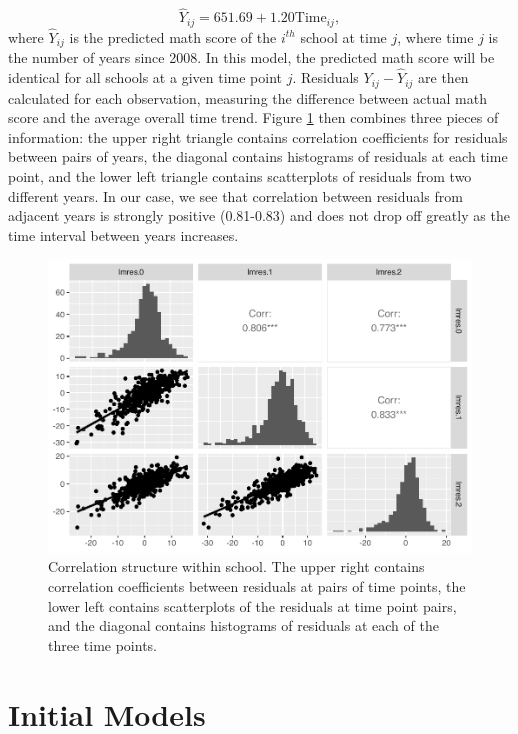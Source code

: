 \documentclass[
]{krantz}
\begin{document}
\begin{equation*}
\hat{Y}_{ij}=651.69+1.20\textrm{Time}_{ij},
\end{equation*}
where \(\hat{Y}_{ij}\) is the predicted math score of the \(i^{th}\) school at time \(j\), where time \(j\) is the number of years since 2008. In this model, the predicted math score will be identical for all schools at a given time point \(j\). Residuals \(Y_{ij}-\hat{Y}_{ij}\) are then calculated for each observation, measuring the difference between actual math score and the average overall time trend. Figure \ref{fig:lon-cor1} then combines three pieces of information: the upper right triangle contains correlation coefficients for residuals between pairs of years, the diagonal contains histograms of residuals at each time point, and the lower left triangle contains scatterplots of residuals from two different years. In our case, we see that correlation between residuals from adjacent years is strongly positive (0.81-0.83) and does not drop off greatly as the time interval between years increases.

\begin{figure}

{\centering \includegraphics[width=0.6\linewidth]{bookdown-BeyondMLR_files/figure-latex/lon-cor1-1} 

}

\caption{Correlation structure within school.  The upper right contains correlation coefficients between residuals at pairs of time points, the lower left contains scatterplots of the residuals at time point pairs, and the diagonal contains histograms of residuals at each of the three time points.}\label{fig:lon-cor1}
\end{figure}

\hypertarget{lineartwostageerror}{%
\section{Initial Models}\label{lineartwostageerror}}
\end{document}
